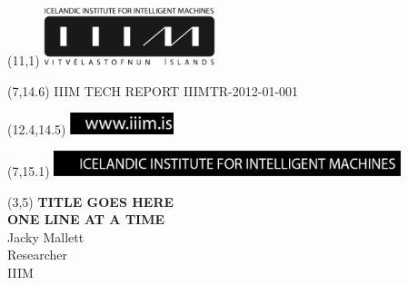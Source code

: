\begin{titlingpage}
\begin{textblock}{2}
\end{textblock}
\begin{textblock}{5}(11,1)
  {\includegraphics[width=5cm]{iiim/IIIM-logo.eps}}
\end{textblock}
\begin{textblock}{8}(7,14.6) {IIIM TECH REPORT IIIMTR-2012-01-001}
\end{textblock}
\begin{textblock}{5}(12.4,14.5)
  {\includegraphics[width=3cm]{iiim/wwwiiimis-black-box.eps}}
\end{textblock}
\begin{textblock}{5}(7,15.1)
   \includegraphics[width=10.1cm]{iiim/IIIM-black-box.eps}
\end{textblock}

\begin{textblock}{10}(3,5)
{
\textbf{\huge  
 TITLE GOES HERE
\vspace{5mm}    \\				%
 ONE LINE AT A TIME
}}
{ \large
\vspace{2cm} \\
  Jacky Mallett
\vspace{4mm} \\
  Researcher
\vspace{4mm} \\
  IIIM
}
\end{textblock}
\end{titlingpage}



